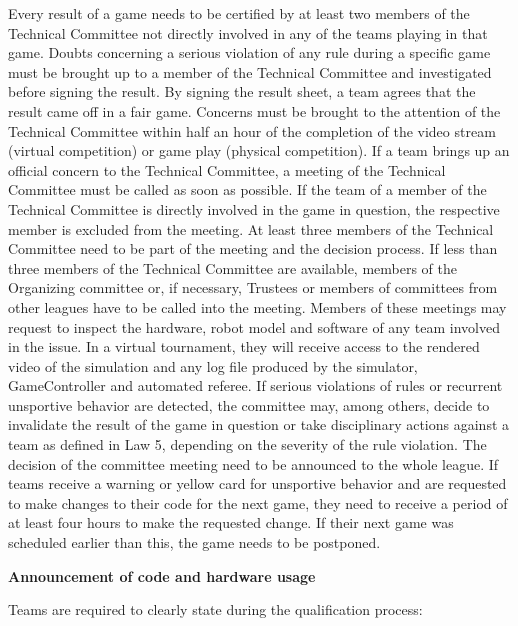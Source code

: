 Every result of a game needs to be certified by at least two members of the Technical Committee not directly involved in any of the teams playing in that game.
Doubts concerning a serious violation of any rule during a specific game must be
brought up to a member of the Technical Committee and investigated before
signing the result.
By signing the result sheet, a team agrees that the result came off in
a fair game.
Concerns must be brought to the attention of the Technical Committee
  within half an hour of the completion of the video stream (virtual competition) or game play (physical competition).
If a team brings up an official concern to the Technical Committee, a meeting of
the Technical Committee must be called as soon as possible.
If the team of a member of the Technical Committee is directly involved in the
game in question, the respective member is excluded from the meeting.
At least three members of the Technical Committee need to be part of the meeting
and the decision process.
If less than three members of the Technical Committee are available,
members of the Organizing committee or, if necessary,
Trustees or members of committees from other leagues have to be called into the
meeting.
Members of these meetings may request to inspect the hardware,
robot model and software of any team involved in the issue.
In a virtual tournament, they will receive access to the rendered video of the
  simulation and any log file produced by the simulator, GameController and
  automated referee.
If serious violations of rules or recurrent unsportive behavior
are detected, the committee may, among others, decide to invalidate the result
of the game in question or take disciplinary actions against a team as defined
in Law 5, depending on the severity of the rule violation.
The decision of the committee meeting need to be announced to the whole league.
If teams receive a warning or yellow card for unsportive behavior and are
  requested to make changes to their code for the next game, they need to
  receive a period of at least four hours to make the requested change.
  If their next game was scheduled earlier than this, the game needs to be
  postponed.


\bigskip

      {\bfseries Announcement of code and hardware usage}
      
      \headlinebox
      
      Teams are required to clearly state during the qualification process:

      \bigskip

